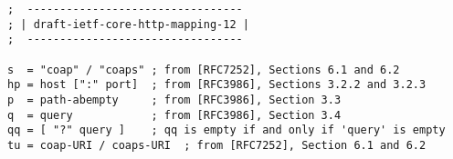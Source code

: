 \begin{verbatim}
;  ---------------------------------
; | draft-ietf-core-http-mapping-12 |
;  ---------------------------------

s  = "coap" / "coaps" ; from [RFC7252], Sections 6.1 and 6.2
hp = host [":" port]  ; from [RFC3986], Sections 3.2.2 and 3.2.3
p  = path-abempty     ; from [RFC3986], Section 3.3
q  = query            ; from [RFC3986], Section 3.4
qq = [ "?" query ]    ; qq is empty if and only if 'query' is empty
tu = coap-URI / coaps-URI  ; from [RFC7252], Section 6.1 and 6.2
\end{verbatim}